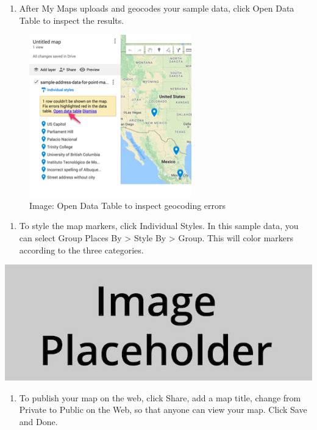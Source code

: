\documentclass[
  english,
]{book}
\providecommand{\tightlist}{%
  \setlength{\itemsep}{0pt}\setlength{\parskip}{0pt}}
\begin{document}
\begin{enumerate}
\def\labelenumi{\arabic{enumi})}
\setcounter{enumi}{6}
\tightlist
\item
  After My Maps uploads and geocodes your sample data, click Open Data Table to inspect the results.
\end{enumerate}

\begin{figure}
\centering
\includegraphics{images/06-map/mymaps-fix-errors.png}
\caption{Image: Open Data Table to inspect geocoding errors}
\end{figure}

\begin{enumerate}
\def\labelenumi{\arabic{enumi})}
\setcounter{enumi}{7}
\tightlist
\item
  To style the map markers, click Individual Styles. In this sample data, you can select Group Places By \textgreater{} Style By \textgreater{} Group. This will color markers according to the three categories.
\end{enumerate}

\includegraphics{images/placeholder.jpg}

\begin{enumerate}
\def\labelenumi{\arabic{enumi})}
\setcounter{enumi}{8}
\tightlist
\item
  To publish your map on the web, click Share, add a map title, change from Private to Public on the Web, so that anyone can view your map. Click Save and Done.
\end{enumerate}
\end{document}
